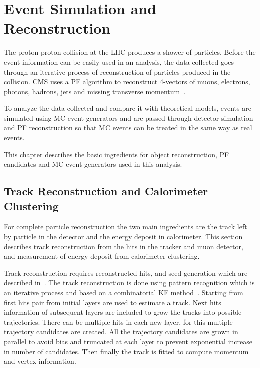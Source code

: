\chapter{
  Event Simulation and Reconstruction
 }\label{ch_reco}

The proton-proton collision at the \gls{LHC} produces a shower of particles. Before
the event information can be easily used in an analysis, the data collected goes
through an iterative process of reconstruction of particles produced in the collision.
\gls{CMS} uses a \gls{PF} algorithm to reconstruct 4-vectors of muons, electrons,
photons, hadrons, jets and missing transverse momentum~\cite{cms-particle-flow-2017}.

To analyze the data collected and compare it with theoretical models, events are
simulated using \gls{MC} event generators and are passed through detector simulation
and \gls{PF} reconstruction so that \gls{MC} events can be treated in the same way as real events.

This chapter describes the basic ingredients for object reconstruction, \gls{PF}
candidates and \gls{MC} event generators used in this analysis.

\section{
  Track Reconstruction and Calorimeter Clustering
 }\label{ch_reco:track-calo}

For complete particle reconstruction the two main ingredients are the track left by particle
in the detector and the energy deposit in calorimeter.
This section describes track reconstruction
from the hits in the tracker and muon detector, and measurement of energy deposit
from calorimeter clustering.

Track reconstruction requires reconstructed hits, and seed generation which are
described in~\cite{cms-track-vertex}. The track reconstruction is done using
pattern recognition which is an iterative process and based on a combinatorial \gls{KF} method~\cite{cms-track-reco}.
Starting from first hits pair from initial layers are used to estimate a track.
Next hits information of subsequent layers are included
to grow the tracks into possible trajectories.
There can be multiple hits in each new layer, for this multiple
trajectory candidates are created.
All the trajectory candidates are grown in parallel
to avoid bias and truncated at each layer to prevent exponential increase
in number of candidates. Then finally the track is fitted to compute momentum
and vertex information.

